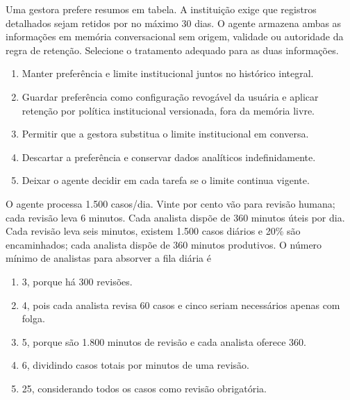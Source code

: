 \TextoBase
Uma gestora prefere resumos em tabela. A instituição exige que registros detalhados sejam retidos por no máximo 30 dias. O agente armazena ambas as informações em memória conversacional sem origem, validade ou autoridade da regra de retenção.
\FonteDidatica
\Comando Selecione o tratamento adequado para as duas informações.
\begin{enumerate}[label=\Alph*)]
\item Manter preferência e limite institucional juntos no histórico integral.
\item Guardar preferência como configuração revogável da usuária e aplicar retenção por política institucional versionada, fora da memória livre.
\item Permitir que a gestora substitua o limite institucional em conversa.
\item Descartar a preferência e conservar dados analíticos indefinidamente.
\item Deixar o agente decidir em cada tarefa se o limite continua vigente.
\end{enumerate}

\TextoBase
O agente processa 1.500 casos/dia. Vinte por cento vão para revisão humana; cada revisão leva 6 minutos. Cada analista dispõe de 360 minutos úteis por dia.
Cada revisão leva seis minutos, existem 1.500 casos diários e 20\% são encaminhados; cada analista dispõe de 360 minutos produtivos.
\FonteDidatica
\Comando O número mínimo de analistas para absorver a fila diária é
\begin{enumerate}[label=\Alph*)]
\item 3, porque há 300 revisões.
\item 4, pois cada analista revisa 60 casos e cinco seriam necessários apenas com folga.
\item 5, porque são 1.800 minutos de revisão e cada analista oferece 360.
\item 6, dividindo casos totais por minutos de uma revisão.
\item 25, considerando todos os casos como revisão obrigatória.
\end{enumerate}

